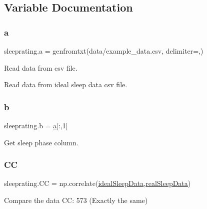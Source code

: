 \subsection{Variable Documentation}
\mbox{\label{namespacesleeprating_a0d156bb774e867fc8ebea212853bd312}} 
\subsubsection{\texorpdfstring{a}{a}}
{\footnotesize\ttfamily sleeprating.\+a = genfromtxt(\textquotesingle{}data/example\+\_\+data.\+csv\textquotesingle{}, delimiter=\textquotesingle{},\textquotesingle{})}



Read data from csv file. 

Read data from ideal sleep data csv file. \mbox{\label{namespacesleeprating_a0daef533b07f6252a2dad70552a90082}} 
\subsubsection{\texorpdfstring{b}{b}}
{\footnotesize\ttfamily sleeprating.\+b = \mbox{\hyperlink{namespacesleeprating_a0d156bb774e867fc8ebea212853bd312}{a}}\mbox{[}\+:,1\mbox{]}}



Get sleep phase column. 

\mbox{\label{namespacesleeprating_abe9d10de2c37eaa74afd164d3121680c}} 
\subsubsection{\texorpdfstring{CC}{CC}}
{\footnotesize\ttfamily sleeprating.\+CC = np.\+correlate(\mbox{\hyperlink{namespacesleeprating_a9e349b9812b2428e147dc1612fa5126d}{ideal\+Sleep\+Data}},\mbox{\hyperlink{namespacesleeprating_a69adab626860ce563388eca964e80eb0}{real\+Sleep\+Data}})}



Compare the data CC\+: 573 (Exactly the same) 

\mbox{\label{namespacesleeprating_aab6cbcbccfa89f1cdeedee015ea70002}} 
